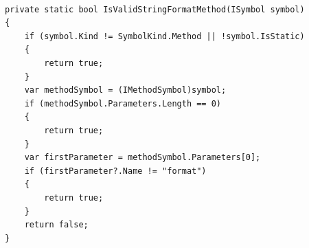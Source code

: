 \begin{lstlisting}

private static bool IsValidStringFormatMethod(ISymbol symbol)
{
	if (symbol.Kind != SymbolKind.Method || !symbol.IsStatic)
	{
		return true;
	}
	var methodSymbol = (IMethodSymbol)symbol;
	if (methodSymbol.Parameters.Length == 0)
	{
		return true;
	}
	var firstParameter = methodSymbol.Parameters[0];
	if (firstParameter?.Name != "format")
	{
		return true;
	}
	return false;
}
\end{lstlisting}
